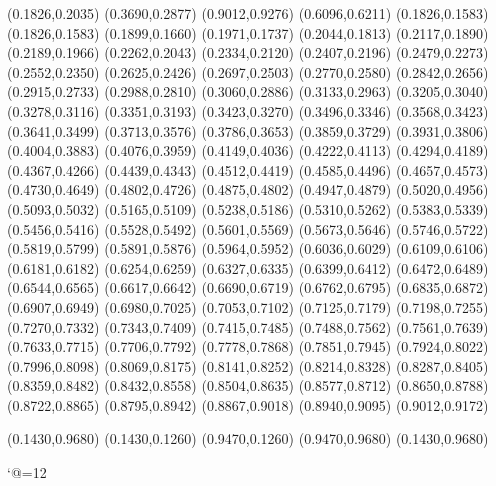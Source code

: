 \PST@Diamond(0.1826,0.2035)
\PST@Diamond(0.3690,0.2877)
\PST@Diamond(0.9012,0.9276)
\PST@Diamond(0.6096,0.6211)
\PST@Dashed(0.1826,0.1583)
(0.1826,0.1583)
(0.1899,0.1660)
(0.1971,0.1737)
(0.2044,0.1813)
(0.2117,0.1890)
(0.2189,0.1966)
(0.2262,0.2043)
(0.2334,0.2120)
(0.2407,0.2196)
(0.2479,0.2273)
(0.2552,0.2350)
(0.2625,0.2426)
(0.2697,0.2503)
(0.2770,0.2580)
(0.2842,0.2656)
(0.2915,0.2733)
(0.2988,0.2810)
(0.3060,0.2886)
(0.3133,0.2963)
(0.3205,0.3040)
(0.3278,0.3116)
(0.3351,0.3193)
(0.3423,0.3270)
(0.3496,0.3346)
(0.3568,0.3423)
(0.3641,0.3499)
(0.3713,0.3576)
(0.3786,0.3653)
(0.3859,0.3729)
(0.3931,0.3806)
(0.4004,0.3883)
(0.4076,0.3959)
(0.4149,0.4036)
(0.4222,0.4113)
(0.4294,0.4189)
(0.4367,0.4266)
(0.4439,0.4343)
(0.4512,0.4419)
(0.4585,0.4496)
(0.4657,0.4573)
(0.4730,0.4649)
(0.4802,0.4726)
(0.4875,0.4802)
(0.4947,0.4879)
(0.5020,0.4956)
(0.5093,0.5032)
(0.5165,0.5109)
(0.5238,0.5186)
(0.5310,0.5262)
(0.5383,0.5339)
(0.5456,0.5416)
(0.5528,0.5492)
(0.5601,0.5569)
(0.5673,0.5646)
(0.5746,0.5722)
(0.5819,0.5799)
(0.5891,0.5876)
(0.5964,0.5952)
(0.6036,0.6029)
(0.6109,0.6106)
(0.6181,0.6182)
(0.6254,0.6259)
(0.6327,0.6335)
(0.6399,0.6412)
(0.6472,0.6489)
(0.6544,0.6565)
(0.6617,0.6642)
(0.6690,0.6719)
(0.6762,0.6795)
(0.6835,0.6872)
(0.6907,0.6949)
(0.6980,0.7025)
(0.7053,0.7102)
(0.7125,0.7179)
(0.7198,0.7255)
(0.7270,0.7332)
(0.7343,0.7409)
(0.7415,0.7485)
(0.7488,0.7562)
(0.7561,0.7639)
(0.7633,0.7715)
(0.7706,0.7792)
(0.7778,0.7868)
(0.7851,0.7945)
(0.7924,0.8022)
(0.7996,0.8098)
(0.8069,0.8175)
(0.8141,0.8252)
(0.8214,0.8328)
(0.8287,0.8405)
(0.8359,0.8482)
(0.8432,0.8558)
(0.8504,0.8635)
(0.8577,0.8712)
(0.8650,0.8788)
(0.8722,0.8865)
(0.8795,0.8942)
(0.8867,0.9018)
(0.8940,0.9095)
(0.9012,0.9172)

\PST@Border(0.1430,0.9680)
(0.1430,0.1260)
(0.9470,0.1260)
(0.9470,0.9680)
(0.1430,0.9680)

\catcode`@=12
\fi
\endpspicture
